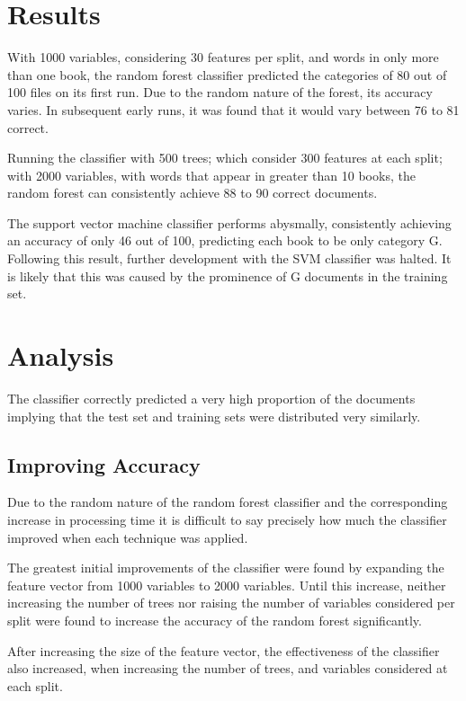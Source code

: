 \documentclass[11pt]{article}
\begin{document}
\section{Results}

With 1000 variables, considering 30 features per split, and words in only more
than one book, the random forest classifier predicted the categories of 80 out
of 100 files on its first run. Due to the random nature of the forest, its
accuracy varies. In subsequent early runs, it was found that it would vary
between 76 to 81 correct.

Running the classifier with 500 trees; which consider 300 features at each
split; with 2000 variables, with words that appear in greater than 10 books, the
random forest can consistently achieve 88 to 90 correct documents.

The support vector machine classifier performs abysmally, consistently achieving
an accuracy of only 46 out of 100, predicting each book to be only category G.
Following this result, further development with the SVM classifier was halted.
It is likely that this was caused by the prominence of G documents in the
training set.

\section{Analysis}

The classifier correctly predicted a very high proportion of the documents
implying that the test set and training sets were distributed very similarly.

\subsection{Improving Accuracy}

Due to the random nature of the random forest classifier and the corresponding
increase in processing time it is difficult to say precisely how much the
classifier improved when each technique was applied.

The greatest initial improvements of the classifier were found by expanding the
feature vector from 1000 variables to 2000 variables. Until this increase,
neither increasing the number of trees nor raising the number of variables
considered per split were found to increase the accuracy of the random forest
significantly. 

After increasing the size of the feature vector, the effectiveness of the
classifier also increased, when increasing the number of trees, and variables
considered at each split.
\end{document}
